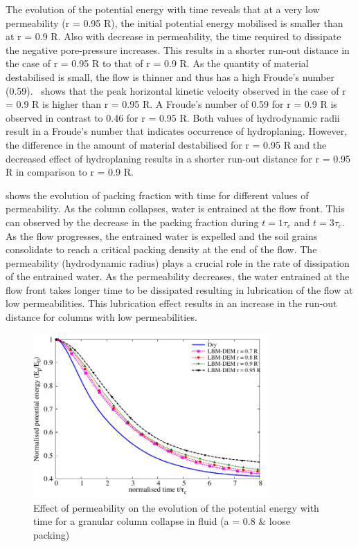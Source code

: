 The evolution of the potential energy with time reveals that at a very low 
permeability (r = 0.95 R), the initial potential energy mobilised is smaller 
than at r = 0.9 R. Also with decrease in permeability, the time required to 
dissipate the negative pore-pressure increases. This results in a shorter 
run-out distance in the case of r = 0.95 R to that of r = 0.9 R. As the 
quantity of material destabilised is small, the flow is thinner and thus has a 
high Froude's number (0.59).~ shows that the peak 
horizontal kinetic velocity observed in the case of r = 0.9 R is higher than r 
= 0.95 R. A Froude's number of 0.59 for r = 0.9 R is observed in contrast to 
0.46 for r = 0.95 R. Both values of hydrodynamic radii result in a Froude's 
number that 
indicates occurrence of hydroplaning. However, the difference in the amount of 
material destabilised for r = 0.95 R and the decreased effect of hydroplaning 
results in a shorter run-out distance for r = 0.95 R in comparison to r = 0.9 
R.


 shows the evolution of packing 
fraction with time for different values of permeability. As the column 
collapses, water is entrained at the flow front. This can 
observed by the decrease in the packing fraction during $t = 1\tau_c$ and $t = 
3\tau_c$. As the flow 
progresses, the entrained water is expelled and the soil grains consolidate to 
reach a critical packing density at the end of the flow. The permeability 
(hydrodynamic radius) plays a crucial role in the rate of dissipation of the 
entrained water. As the permeability decreases, the water entrained at the flow 
front takes longer time to be dissipated resulting in lubrication of the flow 
at low permeabilities. This lubrication effect results in an increase in the 
run-out distance for columns with low permeabilities.

\begin{figure}
	\centering
    \includegraphics[width=0.8\textwidth]{PE_a08_loose}
    \caption{Effect of permeability on the evolution of the potential energy 
    with time for a granular column collapse in fluid (a = 0.8 \& loose 
    packing)}
    \label{fig:PE_a08_loose}
\end{figure}


